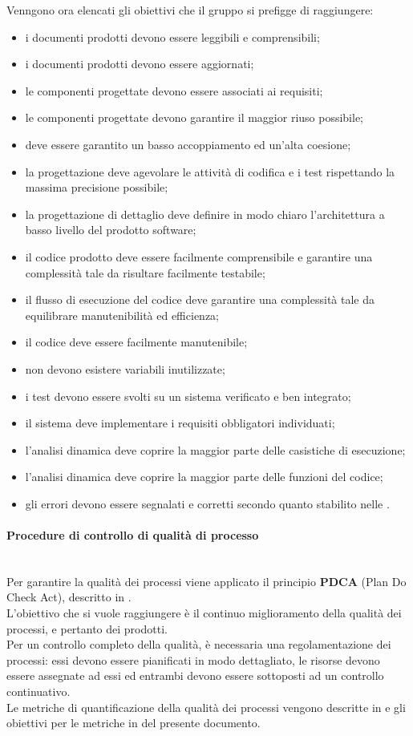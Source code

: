 Venngono ora elencati gli obiettivi che il gruppo si prefigge di raggiungere:
\begin{itemize}
	\item i documenti prodotti devono essere leggibili e comprensibili;
	\item i documenti prodotti devono essere aggiornati;
	\item le componenti progettate devono essere associati ai requisiti;
	\item le componenti progettate devono garantire il maggior riuso possibile;
	\item deve essere garantito un basso accoppiamento ed un'alta coesione;
	\item la progettazione deve agevolare le attività di codifica e i test rispettando la massima precisione possibile;
	\item la progettazione di dettaglio deve definire in modo chiaro l'architettura a basso livello del prodotto software;
	\item il codice prodotto deve essere facilmente comprensibile e garantire una complessità tale da risultare facilmente testabile;
	\item il flusso di esecuzione del codice deve garantire una complessità tale da equilibrare manutenibilità ed efficienza;
	\item il codice deve essere facilmente manutenibile;
	\item non devono esistere variabili inutilizzate;
	\item i test devono essere svolti su un sistema verificato e ben integrato;
	\item il sistema deve implementare i requisiti obbligatori individuati;
	\item l'analisi dinamica deve coprire la maggior parte delle casistiche di esecuzione;
	\item l'analisi dinamica deve coprire la maggior parte delle funzioni del codice;
	\item gli errori devono essere segnalati e corretti secondo quanto stabilito nelle \NormeDiProgetto{}.
\end{itemize}

\paragraph{Procedure di controllo di qualità di processo}\mbox{}\\
Per garantire la qualità dei processi viene applicato il principio \textbf{PDCA} (Plan Do Check Act), descritto in .\\ 
L'obiettivo che si vuole raggiungere è il continuo miglioramento della qualità dei processi, e pertanto dei prodotti.\\
Per un controllo completo della qualità, è necessaria una regolamentazione dei processi: essi devono essere pianificati in modo dettagliato, le risorse devono essere assegnate ad essi ed entrambi devono essere sottoposti ad un controllo continuativo.\\
Le metriche di quantificazione della qualità dei processi vengono descritte in \NormeDiProgetto{} e gli obiettivi per le metriche in  del presente documento.

